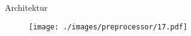 \begin{frame}{Architektur}
    \begin{figure}
    	\centering
    	\texttt{[image: ./images/preprocessor/17.pdf]}
    \end{figure}
\end{frame}
